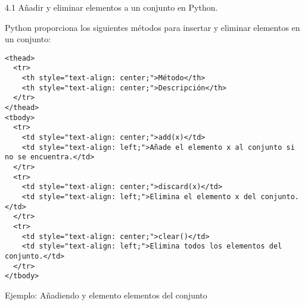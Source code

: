 \documentclass[11pt]{article}
\begin{document}
    4.1 Añadir y eliminar elementos a un conjunto en Python.

    Python proporciona los siguientes métodos para insertar y eliminar
elementos en un conjunto:

    \begin{verbatim}
<thead>
  <tr>
    <th style="text-align: center;">Método</th>
    <th style="text-align: center;">Descripción</th>
  </tr>
</thead>
<tbody>
  <tr>
    <td style="text-align: center;">add(x)</td>
    <td style="text-align: left;">Añade el elemento x al conjunto si no se encuentra.</td>
  </tr>
  <tr>
    <td style="text-align: center;">discard(x)</td>
    <td style="text-align: left;">Elimina el elemento x del conjunto.</td>
  </tr>
  <tr>
    <td style="text-align: center;">clear()</td>
    <td style="text-align: left;">Elimina todos los elementos del conjunto.</td>
  </tr>
</tbody>
\end{verbatim}

    Ejemplo: Añadiendo y elemento elementos del conjunto
\end{document}
